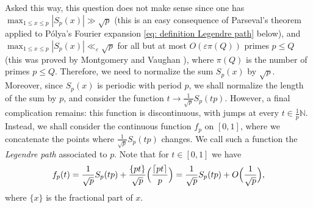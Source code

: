 \documentclass[JEP,XML,SOM,Unicode,NoFloatCountersInSection,published]{cedram}
\theoremstyle{plain}
\theoremstyle{definition}
\newcommand{\Legendre}[2]{\Bigl(\dfrac{#1}{#2}\Bigr)}
\let\ep\varepsilon
\begin{document}
Asked this way, this question does not make sense since one has $\max_{1\leq x\leq p}|S_p(x)|\gg\sqrt{p}$ (this is an easy consequence of Parseval's theorem applied to Pólya's Fourier expansion \eqref{eq: definition Legendre path} below), and $\max_{1\leq x\leq p}|S_p(x)|\ll_{\ep} \sqrt{p}$ for all but at most $O(\ep \pi(Q))$ primes $p\leq Q$ (this was proved by Montgomery and Vaughan \cite{MoVa79}), where $\pi(Q)$ is the number of primes $p\leq Q$. Therefore, we need to normalize the sum $S_p(x)$ by $\sqrt{p}$. Moreover, since $S_p(x)$ is periodic with period $p$, we shall normalize the length of the sum by $p$, and consider the function $t\to \frac{1}{\sqrt{p}} S_p(tp)$. However, a final complication remains: this function is discontinuous, with jumps at every $t \in \frac{1}{p}\mathbb{N}$. Instead, we shall consider the continuous function $f_p$ on $[0,1]$, where we concatenate the points where $\frac{1}{\sqrt{p}} S_p(tp)$ changes. We call such a function the \emph{Legendre path} associated to $p$. Note that for $t\in [0,1]$ we have\vspace*{-3pt}\enlargethispage{.5\baselineskip}
\begin{equation}\label{Eq: RelationFpSp}
f_p(t) = \frac{1}{\sqrt{p}}S_p(tp) + \frac{\{ pt \}}{\sqrt{p}} \Legendre{\lceil pt \rceil }{p}= \frac{1}{\sqrt{p}}S_p(tp) + O\Bigl(\frac{1}{\sqrt{p}}\Bigr),
\end{equation}
where $\{x \}$ is the fractional part of $x$.
\end{document}
